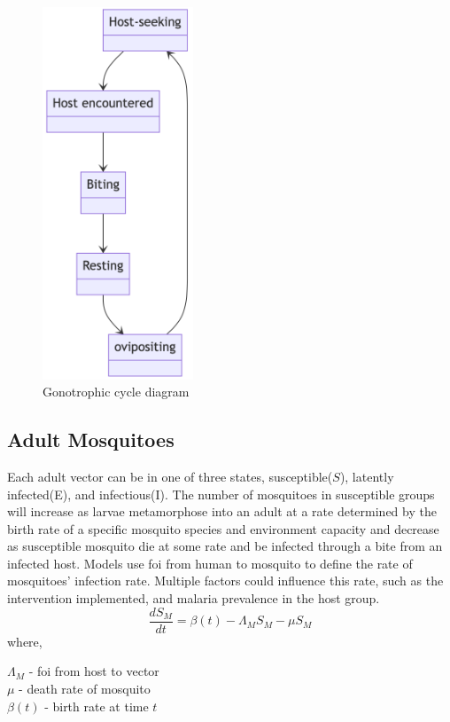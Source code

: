 \documentclass[a4paper, 12pt, twoside]{report}
\begin{document}
\begin{figure}[htpb]
	\centering
	\includegraphics[width=0.4\textwidth]{gonotrophic-cycle-diagram}
	\caption{Gonotrophic cycle diagram}
	\label{fig:gonotrophic-cycle-diagram}
\end{figure}

\subsection{Adult Mosquitoes}
Each adult vector can be in one of three states, susceptible($S$), latently infected(E), and infectious(I).
The number of mosquitoes in susceptible groups will increase as larvae metamorphose into an adult at a rate determined by the birth rate of a specific mosquito species and environment capacity and decrease as susceptible mosquito die at some rate and be infected through a bite from an infected host.
Models use \gls{foi} from human to mosquito to define the rate of mosquitoes' infection rate.
Multiple factors could influence this rate, such as the intervention implemented, and malaria prevalence in the host group.
\begin{equation}
  \frac{dS_M}{dt} = \beta(t) - \Lambda_M S_M - \mu S_M
\end{equation}
where,
\begin{centering}
  $\Lambda_M$ - \gls{foi} from host to vector \\
  $\mu$ - death rate of mosquito\\
  $\beta(t)$ - birth rate at time  $t$\\
\end{centering}
\end{document}
